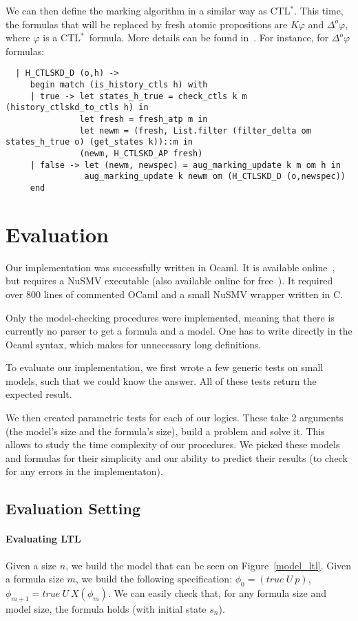 \documentclass[dvipsnames]{acmart}
\def\ctls{CTL$^{*}$}
\def\ltl{LTL}
\def\U{\mathit{U}}
\def\X{\mathit{X}}
\def\K{\mathit{K}}
\def\D#1{\Delta^{#1}}
\begin{document}
We can then define the marking algorithm in a similar way as \ctls. This time, the formulas that will be replaced by fresh atomic propositions are $\K\varphi$ and $\D{o}\varphi$, where $\varphi$ is a \ctls\ formula. More details can be found in~\cite{internship}.
For instance, for $\D{o}\varphi$ formulas:
\begin{lstlisting}
  | H_CTLSKD_D (o,h) ->
     begin match (is_history_ctls h) with
     | true -> let states_h_true = check_ctls k m (history_ctlskd_to_ctls h) in
               let fresh = fresh_atp m in
               let newm = (fresh, List.filter (filter_delta om states_h_true o) (get_states k))::m in
               (newm, H_CTLSKD_AP fresh)
     | false -> let (newm, newspec) = aug_marking_update k m om h in
                aug_marking_update k newm om (H_CTLSKD_D (o,newspec))
     end
\end{lstlisting}


\section{Evaluation}
Our implementation was successfully written in Ocaml. It is available online~\cite{ctlskd_mc}, but requires a NuSMV executable (also available online for free~\cite{get_nusmv}). It required over 800 lines of commented OCaml and a small NuSMV wrapper written in C.

Only the model-checking procedures were implemented, meaning that there is currently no parser to get a formula and a model. One has to write directly in the Ocaml syntax, which makes for unnecessary long definitions.

To evaluate our implementation, we first wrote a few generic tests on small models, such that we could know the answer.
All of these tests return the expected result.

We then created parametric tests for each of our logics. These take 2 arguments (the model's size and the formula's size), build a problem and solve it. This allows to study the time complexity of our procedures. We picked these models and formulas for their simplicity and our ability to predict their results (to check for any errors in the implementaton).

\subsection{Evaluation Setting}
\paragraph{Evaluating \ltl}
Given a size $n$, we build the model that can be seen on Figure~\ref{model_ltl}.
Given a formula size $m$, we build the following specification:
$\phi_0 = (true~\U~p)$,\quad $\phi_{m+1} = true~\U~\X (\phi_m)$.
We can easily check that, for any formula size and model size, the formula holds (with initial state $s_n$).
\end{document}

